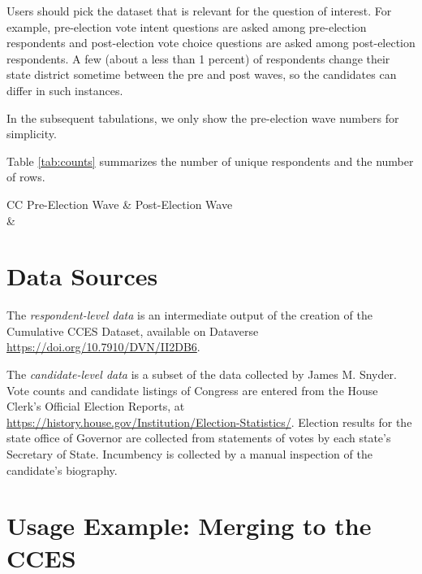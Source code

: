\documentclass[12pt]{article}
\begin{document}
Users should pick the dataset that is relevant for the question of interest. For example, pre-election vote intent questions are asked among pre-election respondents and post-election vote choice questions are asked among post-election respondents. A few (about a less than 1 percent) of respondents change their state district sometime between the pre and post waves, so the candidates can differ in such instances.  

In the subsequent tabulations, we only show the pre-election wave numbers for simplicity.

Table \ref{tab:counts} summarizes the number of unique respondents and the number of rows.

\begin{table}[!h]
\caption{\textbf{Summary of Counts} \label{tab:counts}}
\begin{tabularx}{\linewidth}{CC}
    Pre-Election Wave & Post-Election Wave\\
     & 
    \\
\end{tabularx}
\end{table}


\section{Data Sources}

The \emph{respondent-level data} is an intermediate output of the creation of the Cumulative CCES Dataset, available on Dataverse \url{https://doi.org/10.7910/DVN/II2DB6}.


The \emph{candidate-level data} is a subset of the data collected by James M. Snyder. Vote counts and candidate listings of Congress are entered from the House Clerk's Official Election Reports, at \url{https://history.house.gov/Institution/Election-Statistics/}.  Election results for the state office of Governor are collected from statements of votes by each state's Secretary of State.  Incumbency is collected by a manual inspection of the candidate's biography. 


\FloatBarrier

\clearpage

\section{Usage Example: Merging to the CCES}
\end{document}
